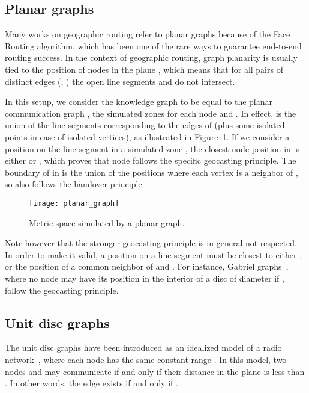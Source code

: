\documentclass{article}
\begin{document}
\subsection{Planar graphs}
\label{sub_planar}
Many works on geographic routing refer to planar graphs because of the Face Routing algorithm, which has been one of the rare ways to guarantee end-to-end routing success. In the context of geographic routing, graph planarity is usually tied to the position of nodes in the plane , which means that for all pairs of distinct edges (, ) the open line segments  and  do not intersect.

In this setup, we consider the knowledge graph  to be equal to the planar communication graph , the simulated zones  for each node  and . In effect,  is the union of the line segments corresponding to the edges of  (plus some isolated points in case of isolated vertices), as illustrated in Figure~\ref{fig_planar_graph}. If we consider a position  on the line segment  in a simulated zone , the closest node position in  is either  or , which proves that node  follows the specific geocasting principle. The boundary of  in  is the union of the positions  where each vertex  is a neighbor of , so  also follows the handover principle.

\begin{figure}[h]
\begin{center}
\texttt{[image: planar\_graph]}
\caption{Metric space simulated by a planar graph.}
\label{fig_planar_graph}
\end{center}
\end{figure}

Note however that the stronger geocasting principle is in general not respected. In order to make it valid, a position on a line segment  must be closest to either ,  or the position  of a common neighbor of  and . For instance, Gabriel graphs~\cite{bib_gabriel}, where no node  may have its position  in the interior of a disc of diameter  if , follow the geocasting principle.

\subsection{Unit disc graphs}

The unit disc graphs have been introduced as an idealized model of a radio network~\cite{bib_udg}, where each node has the same constant range . In this model, two nodes  and  may communicate if and only if their distance in the plane is less than . In other words, the edge  exists if and only if .
\end{document}
